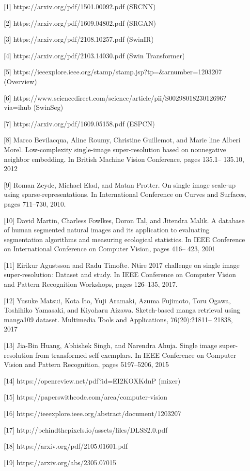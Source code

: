 \documentclass{article}
\begin{document}
[1] https://arxiv.org/pdf/1501.00092.pdf (SRCNN)

[2] https://arxiv.org/pdf/1609.04802.pdf (SRGAN)

[3] https://arxiv.org/pdf/2108.10257.pdf (SwinIR)

[4] https://arxiv.org/pdf/2103.14030.pdf (Swin Transformer)

[5] https://ieeexplore.ieee.org/stamp/stamp.jsp?tp=\&arnumber=1203207 (Overview)

[6] https://www.sciencedirect.com/science/article/pii/S0029801823012696?via=ihub (SwinSeg)

[7] https://arxiv.org/pdf/1609.05158.pdf (ESPCN)

[8] Marco Bevilacqua, Aline Roumy, Christine Guillemot, and Marie line Alberi Morel. Low-complexity single-image super-resolution based on nonnegative neighbor embedding. In British Machine Vision Conference, pages 135.1– 135.10, 2012

    [9] Roman Zeyde, Michael Elad, and Matan Protter. On single image scale-up using sparse-representations. In International Conference on Curves and Surfaces, pages 711–730, 2010.

    [10] David Martin, Charless Fowlkes, Doron Tal, and Jitendra Malik. A database of human segmented natural images and its application to evaluating segmentation algorithms and measuring ecological statistics. In IEEE Conference on International Conference on Computer Vision, pages 416– 423, 2001

    [11] Eirikur Agustsson and Radu Timofte. Ntire 2017 challenge on single image super-resolution: Dataset and study. In IEEE Conference on Computer Vision and Pattern Recognition Workshops, pages 126–135, 2017.

    [12] Yusuke Matsui, Kota Ito, Yuji Aramaki, Azuma Fujimoto, Toru Ogawa, Toshihiko Yamasaki, and Kiyoharu Aizawa. Sketch-based manga retrieval using manga109 dataset. Multimedia Tools and Applications, 76(20):21811– 21838, 2017

    [13]  Jia-Bin Huang, Abhishek Singh, and Narendra Ahuja. Single image super-resolution from transformed self exemplars. In IEEE Conference on Computer Vision and Pattern Recognition, pages 5197–5206, 2015

    [14] https://openreview.net/pdf?id=EI2KOXKdnP (mixer)

[15] https://paperswithcode.com/area/computer-vision

[16] https://ieeexplore.ieee.org/abstract/document/1203207

[17] http://behindthepixels.io/assets/files/DLSS2.0.pdf

[18] https://arxiv.org/pdf/2105.01601.pdf

[19] https://arxiv.org/abs/2305.07015
\end{document}
